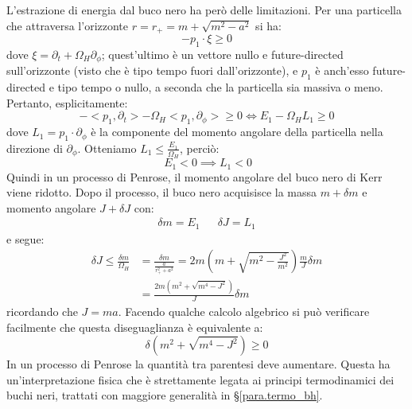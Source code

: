 L'estrazione di energia dal buco nero ha però delle limitazioni. Per una particella che attraversa l'orizzonte $r= r_+ = m + \sqrt{m^2 - a^2}$ si ha:
\begin{equation*}
    - p_1 \cdot \xi \geq 0
\end{equation*}
dove $\xi = \partial_t + \Omega_H \partial_\phi$; quest'ultimo è un vettore nullo e future-directed sull'orizzonte (visto che è tipo tempo fuori dall'orizzonte), e $p_1$ è anch'esso future-directed e tipo tempo o nullo, a seconda che la particella sia massiva o meno. Pertanto, esplicitamente:
\begin{equation*}
    - < p_1, \partial_t > - \Omega_H < p_1, \partial_\phi > \geq 0 \iff  E_1 - \Omega_H L_1 \geq 0 
\end{equation*}
dove $L_1 = p_1 \cdot \partial_\phi$ è la componente del momento angolare della particella nella direzione di $\partial_\phi$. Otteniamo $L_1 \leq \frac{E_1}{\Omega_H}$, perciò:
\begin{equation*}
     \ E_1 < 0 \implies L_1 < 0 
\end{equation*}
Quindi in un processo di Penrose, il momento angolare del buco nero di Kerr viene ridotto. Dopo il processo, il buco nero acquisisce la massa $m + \delta m$ e momento angolare $J + \delta J$ con:
\begin{align*}
    \delta m = E_1 && \delta J = L_1
\end{align*}
e segue:
\begin{align*}
    \delta J \leq \frac{\delta m}{\Omega_H} &= \frac{\delta m}{\frac{a}{r_+^2 + a^2}} = 2m\left(m + \sqrt{m^2 - \frac{J^2}{m^2}}\right)\frac{m}{J}\delta m \\
    &= \frac{2m( m^2 + \sqrt{m^4 - J^2})}{J}\delta m
\end{align*}
ricordando che $J = ma$. Facendo qualche calcolo algebrico si può verificare facilmente che questa diseguaglianza è equivalente a:
\begin{equation*}
    \delta \left( m^2 + \sqrt{m^4 - J^2} \right) \geq 0
\end{equation*}
In un processo di Penrose la quantità tra parentesi deve aumentare. Questa ha un'interpretazione fisica che è strettamente legata ai principi termodinamici dei buchi neri, trattati con maggiore generalità in \S\ref{para.termo_bh}.


